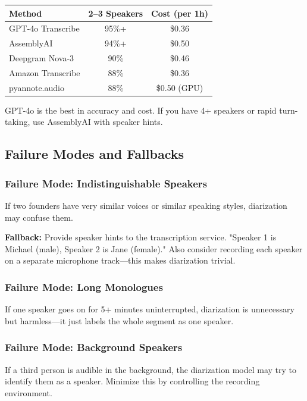 \documentclass[11pt,letterpaper]{article}
\begin{document}
\begin{center}
\begin{tabular}{lcc}
\toprule
\textbf{Method} & \textbf{2–3 Speakers} & \textbf{Cost (per 1h)} \\
\midrule
GPT-4o Transcribe & 95\%+ & \$0.36 \\
AssemblyAI & 94\%+ & \$0.50 \\
Deepgram Nova-3 & 90\% & \$0.46 \\
Amazon Transcribe & 88\% & \$0.36 \\
pyannote.audio & 88\% & \$0.50 (GPU) \\
\bottomrule
\end{tabular}
\end{center}

GPT-4o is the best in accuracy and cost. If you have 4+ speakers or rapid turn-taking, use AssemblyAI with speaker hints.

\subsection{Failure Modes and Fallbacks}

\subsubsection{Failure Mode: Indistinguishable Speakers}

If two founders have very similar voices or similar speaking styles, diarization may confuse them.

\textbf{Fallback:} Provide speaker hints to the transcription service. "Speaker 1 is Michael (male), Speaker 2 is Jane (female)." Also consider recording each speaker on a separate microphone track—this makes diarization trivial.

\subsubsection{Failure Mode: Long Monologues}

If one speaker goes on for 5+ minutes uninterrupted, diarization is unnecessary but harmless—it just labels the whole segment as one speaker.

\subsubsection{Failure Mode: Background Speakers}

If a third person is audible in the background, the diarization model may try to identify them as a speaker. Minimize this by controlling the recording environment.
\end{document}
